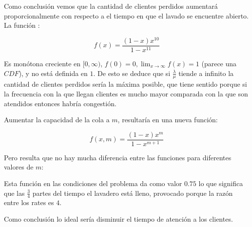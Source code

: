 \documentclass[14pt]{extarticle}
\begin{document}
Como conclusión vemos que la cantidad de clientes perdidos aumentará proporcionalmente con respecto a el tiempo en que el lavado se encuentre abierto. La función :

$$f(x) = \frac{(1-x)x^{10}}{1-x^{11}}$$

Es monótona creciente en $[0, \infty)$, $f(0) = 0, \lim_{x \to \infty} f(x) = 1$ (parece una $CDF$), y no está definida en $1$. De esto se deduce que si $\frac{\lambda}{\mu}$ tiende a infinito la cantidad de clientes perdidos sería la máxima posible, que tiene sentido porque si la frecuencia con la que llegan clientes es mucho mayor comparada con la que son atendidos entonces habría congestión.

Aumentar la capacidad de la cola a $m$, resultaría en una nueva función:

$$f(x, m) = \frac{(1-x)x^{m}}{1-x^{m+1}}$$

Pero resulta que no hay mucha diferencia entre las funciones para diferentes valores de $m$:

\begin{figure}[htbp]
    \centering
    
  \end{figure}

Esta función en las condiciones del problema da como valor $0.75$ lo que significa que las $\frac{3}{4}$ partes del tiempo el lavadero está lleno, provocado porque la razón entre los rates es $4$.

Como conclusión lo ideal sería disminuir el tiempo de atención a los clientes.
\end{document}
